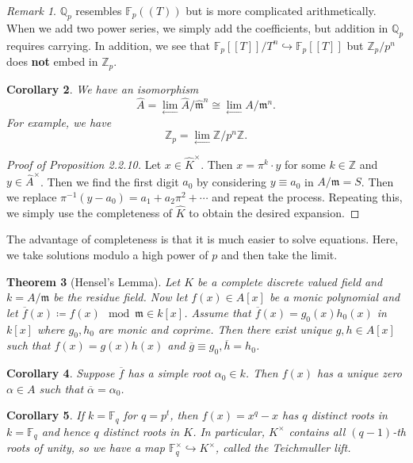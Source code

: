 \documentclass[leqno, openany]{memoir}
\newtheorem{thm}{Theorem}[section]
\newtheorem{cor}[thm]{Corollary}
\theoremstyle{definition}
\theoremstyle{remark}
\newtheorem{rmk}[thm]{Remark}
\theoremstyle{plain}
\theoremstyle{definition}
\theoremstyle{remark}
\newcommand{\F}{\mathbb{F}}
\newcommand{\Z}{\mathbb{Z}}
\newcommand{\Q}{\mathbb{Q}}
\newcommand{\mf}[1]{\mathfrak{#1}}
\newcommand{\ol}[1]{\overline{#1}}
\newcommand{\wh}[1]{\widehat{#1}}
\begin{document}
\begin{rmk}
    $\Q_p$ resembles $\F_p((T))$ but is more complicated arithmetically. When we add two power series, we simply add the coefficients, but addition in $\Q_p$ requires carrying. In addition, we see that $\F_p [[T]] / T^n \hookrightarrow \F_p[[T]]$ but $\Z_p / p^n$ does \textbf{not} embed in $\Z_p$. 
\end{rmk}

\begin{cor}
    We have an isomorphism
    \[ \wh{A} = \lim_{\longleftarrow} \wh{A} / \wh{\mf{m}}^n \cong \lim_{\longleftarrow} A/\mf{m}^n. \]
    For example, we have
    \[ \Z_p = \lim_{\longleftarrow} \Z/p^n \Z. \]
\end{cor}

\begin{proof}[Proof of Proposition 2.2.10]
    Let $x \in \wh{K}^{\times}$. Then $x = \pi^k \cdot y$ for some $k \in \Z$ and $y \in \wh{A}^{\times}$. Then we find the first digit $a_0$ by considering $y \equiv a_0$ in $A/\mf{m} = S$. Then we replace $\pi^{-1} (y-a_0) = a_1 + a_2 \pi^2 + \cdots$ and repeat the process. Repeating this, we simply use the completeness of $\wh{K}$ to obtain the desired expansion.
\end{proof}

The advantage of completeness is that it is much easier to solve equations. Here, we take solutions modulo a high power of $p$ and then take the limit.

\begin{thm}[Hensel's Lemma]
    Let $K$ be a complete discrete valued field and $k = A/\mf{m}$ be the residue field. Now let $f(x) \in A[x]$ be a monic polynomial and let $\ol{f}(x) \coloneqq f(x) \mod \mf{m} \in k[x]$. Assume that $\ol{f}(x) = g_0(x) h_0(x)$ in $k[x]$ where $g_0, h_0$ are monic and coprime. Then there exist unique $g,h \in A[x]$ such that $f(x) = g(x) h(x)$ and $\ol{g} \equiv g_0, \ol{h} = h_0$.
\end{thm}

\begin{cor}
    Suppose $\ol{f}$ has a simple root $\alpha_0 \in k$. Then $f(x)$ has a unique zero $\alpha \in A$ such that $\ol{\alpha} = \alpha_0$.
\end{cor}

\begin{cor}
    If $k = \F_q$ for $q = p^t$, then $f(x) = x^q - x$ has $q$ distinct roots in $k = \F_q$ and hence $q$ distinct roots in $K$. In particular, $K^{\times}$ contains all $(q-1)$-th roots of unity, so we have a map $\F_q^{\times }\hookrightarrow K^{\times}$, called the \textit{Teichmuller lift}. 
\end{cor}
\end{document}
